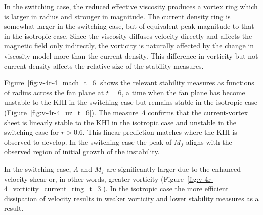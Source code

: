 In the switching case, the reduced effective viscosity produces a vortex ring which is larger in radius and stronger in magnitude. The current density ring is somewhat larger in the switching case, but of equivalent peak magnitude to that in the isotropic case. Since the viscosity diffuses velocity directly and affects the magnetic field only indirectly, the vorticity is naturally affected by the change in viscosity model more than the current density. This difference in vorticity but not current density affects the relative size of the stability measures.

Figure~\ref{fig:v-4r-4_mach_t_6} shows the relevant stability measures as functions of radius across the fan plane at $t=6$, a time when the fan plane has become unstable to the KHI in the switching case but remains stable in the isotropic case (Figure~\ref{fig:v-4r-4_uz_t_6}). The measure $\Lambda$ confirms that the current-vortex sheet is linearly stable to the KHI in the isotropic case and unstable in the switching case for $r>0.6$. This linear prediction matches where the KHI is observed to develop. In the switching case the peak of $M_f$ aligns with the observed region of initial growth of the instability.

In the switching case, $\Lambda$ and $M_f$ are significantly larger due to the enhanced velocity shear or, in other words, greater vorticity (Figure~\ref{fig:v-4r-4_vorticity_current_ring_t_3}). In the isotropic case the more efficient dissipation of velocity results in weaker vorticity and lower stability measures as a result.


